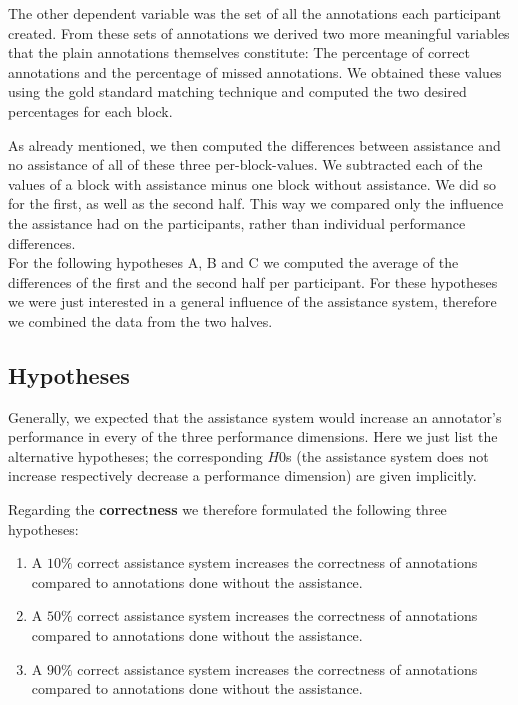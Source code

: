 		The other dependent variable was the set of all the annotations each participant created. From these sets of annotations we derived two more meaningful variables that the plain annotations themselves constitute: The percentage of correct annotations and the percentage of missed annotations. We obtained these values using the gold standard matching technique and computed the two desired percentages for each block.

		As already mentioned, we then computed the differences between assistance and no assistance of all of these three per-block-values. We subtracted each of the values of a block with assistance minus one block without assistance. We did so for the first, as well as the second half. This way we compared only the influence the assistance had on the participants, rather than individual performance differences.\\
		For the following hypotheses A, B and C we computed the average of the differences of the first and the second half per participant. For these hypotheses we were just interested in a general influence of the assistance system, therefore we combined the data from the two halves.

	\subsection{Hypotheses}
		\label{sec:hypotheses}
		Generally, we expected that the assistance system would increase an annotator's performance in every of the three performance dimensions. Here we just list the alternative hypotheses; the corresponding \(H0\)s (the assistance system does not increase respectively decrease a performance dimension) are given implicitly.

		Regarding the \textbf{correctness} we therefore formulated the following three hypotheses:

		\begin{enumerate}[{A}i)]
			\item A \(10\%\) correct assistance system increases the correctness of annotations compared to annotations done without the assistance.
			\item A \(50\%\) correct assistance system increases the correctness of annotations compared to annotations done without the assistance.
			\item A \(90\%\) correct assistance system increases the correctness of annotations compared to annotations done without the assistance.
		\end{enumerate}
		\vspace{0.5cm}


